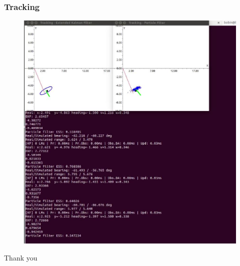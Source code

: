 \documentclass[14pt,hyperref={CJKbookmarks=true}]{beamer}
\theoremstyle{plain}
\theoremstyle{definition}
\theoremstyle{remark}
\begin{document}
\begin{frame}
\frametitle{Tracking}\small
\begin{figure}
\centering
\includegraphics[width=0.5\linewidth]{tracking.jpg}
\end{figure}

\end{frame}

%
%
%
%
%
%


\begin{frame}
\Huge
\begin{center}
Thank you
\end{center}
\end{frame}
\end{document}
